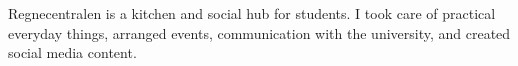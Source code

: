 Regnecentralen is a kitchen and social hub for students. I took care of practical
everyday things, arranged events, communication with the university, and created social
media content.
